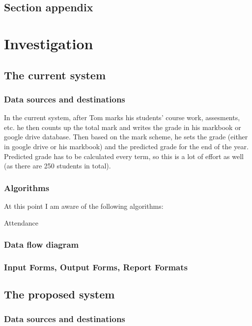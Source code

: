 \subsection{Section appendix}

\section{Investigation}

\subsection{The current system}
\subsubsection{Data sources and destinations}
In the current system, after Tom marks his students' course work, assesments, etc. he then counts up the total mark and writes the grade in his markbook or google drive database. Then based on the mark scheme, he sets the grade (either in google drive or his markbook) and the predicted grade for the end of the year. Predicted grade has to be calculated every term, so this is a lot of effort as well (as there are 250 students in total).

\subsubsection{Algorithms}
At this point I am aware of the following algorithms:

Attendance


\subsubsection{Data flow diagram}

\subsubsection{Input Forms, Output Forms, Report Formats}

\subsection{The proposed system}

\subsubsection{Data sources and destinations}

